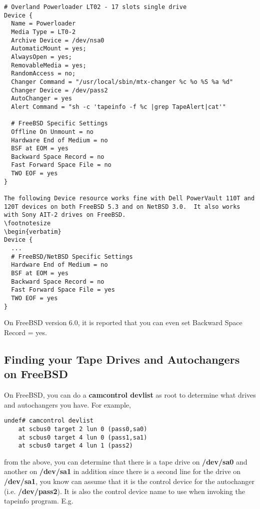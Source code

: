 \footnotesize
\begin{verbatim}
# Overland Powerloader LT02 - 17 slots single drive
Device {
  Name = Powerloader
  Media Type = LT0-2
  Archive Device = /dev/nsa0
  AutomaticMount = yes;
  AlwaysOpen = yes;
  RemovableMedia = yes;
  RandomAccess = no;
  Changer Command = "/usr/local/sbin/mtx-changer %c %o %S %a %d"
  Changer Device = /dev/pass2
  AutoChanger = yes
  Alert Command = "sh -c 'tapeinfo -f %c |grep TapeAlert|cat'"

  # FreeBSD Specific Settings
  Offline On Unmount = no
  Hardware End of Medium = no
  BSF at EOM = yes
  Backward Space Record = no
  Fast Forward Space File = no
  TWO EOF = yes
}

The following Device resource works fine with Dell PowerVault 110T and
120T devices on both FreeBSD 5.3 and on NetBSD 3.0.  It also works
with Sony AIT-2 drives on FreeBSD.
\footnotesize
\begin{verbatim}
Device {
  ...
  # FreeBSD/NetBSD Specific Settings
  Hardware End of Medium = no
  BSF at EOM = yes
  Backward Space Record = no
  Fast Forward Space File = yes
  TWO EOF = yes
}
\end{verbatim}
\normalsize

On FreeBSD version 6.0, it is reported that you can even set
Backward Space Record = yes.



\subsection{Finding your Tape Drives and Autochangers on FreeBSD}

On FreeBSD, you can do a {\bf camcontrol devlist} as root to determine what
drives and autochangers you have. For example,

\footnotesize
\begin{verbatim}
undef# camcontrol devlist
    at scbus0 target 2 lun 0 (pass0,sa0)
    at scbus0 target 4 lun 0 (pass1,sa1)
    at scbus0 target 4 lun 1 (pass2)
\end{verbatim}
\normalsize

from the above, you can determine that there is a tape drive on {\bf /dev/sa0}
and another on {\bf /dev/sa1} in addition since there is a second line for the
drive on {\bf /dev/sa1}, you know can assume that it is the control device for
the autochanger (i.e. {\bf /dev/pass2}). It is also the control device name to
use when invoking the tapeinfo program. E.g.

